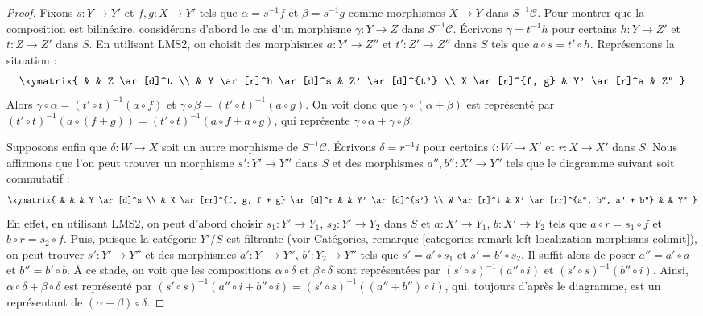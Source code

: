 \begin{proof}
\medskip\noindent
Fixons $s : Y \to Y'$ et $f, g : X \to Y'$ tels que
$\alpha = s^{-1}f$ et $\beta = s^{-1}g$ comme morphismes $X \to Y$
dans $S^{-1}\mathcal{C}$.
Pour montrer que la composition est bilinéaire, considérons d'abord le cas d'un
morphisme $\gamma : Y \to Z$ dans $S^{-1}\mathcal{C}$. Écrivons $\gamma = t^{-1}h$
pour certains $h : Y \to Z'$ et $t : Z \to Z'$ dans $S$. En utilisant LMS2, on
choisit des morphismes $a : Y' \to Z''$ et $t' : Z' \to Z''$ dans $S$ tels
que $a \circ s = t' \circ h$. Représentons la situation :
$$
\xymatrix{
& & Z \ar[d]^t \\
& Y \ar[r]^h \ar[d]^s & Z' \ar[d]^{t'} \\
X \ar[r]^{f, g} & Y' \ar[r]^a & Z''
}
$$
Alors
$\gamma \circ \alpha = (t' \circ t)^{-1}(a \circ f)$ et
$\gamma \circ \beta = (t' \circ t)^{-1}(a \circ g)$.
On voit donc que $\gamma \circ (\alpha + \beta)$ est représenté
par $(t' \circ t)^{-1}(a \circ (f + g)) =
(t' \circ t)^{-1}(a \circ f + a \circ g)$, qui représente
$\gamma \circ \alpha + \gamma \circ \beta$.

\medskip\noindent
Supposons enfin que $\delta : W \to X$ soit un autre morphisme de
$S^{-1}\mathcal{C}$. Écrivons $\delta = r^{-1}i$ pour certains
$i : W \to X'$ et $r : X \to X'$ dans $S$. Nous affirmons que l'on peut trouver
un morphisme $s' : Y' \to Y''$ dans $S$ et des morphismes $a'', b'' : X' \to Y''$
tels que le diagramme suivant soit commutatif :
$$
\xymatrix{
& & & Y \ar[d]^s \\
& X \ar[rr]^{f, g, f + g} \ar[d]^r & & Y' \ar[d]^{s'} \\
W \ar[r]^i & X' \ar[rr]^{a'', b'', a'' + b''} & & Y''
}
$$
En effet, en utilisant LMS2, on peut d'abord choisir
$s_1 : Y' \to Y_1$, $s_2 : Y' \to Y_2$ dans $S$ et
$a : X' \to Y_1$, $b : X' \to Y_2$ tels que
$a \circ r = s_1 \circ f$ et $b \circ r = s_2 \circ f$.
Puis, puisque la catégorie $Y'/S$ est filtrante (voir
Catégories, remarque \ref{categories-remark-left-localization-morphisms-colimit}),
on peut
trouver $s' : Y' \to Y''$ et des morphismes $a' : Y_1 \to Y''$, $b' : Y_2 \to Y''$
tels que $s' = a' \circ s_1$ et $s' = b' \circ s_2$. Il suffit alors de poser
$a'' = a' \circ a$ et $b'' = b' \circ b$.
À ce stade, on voit que les compositions
$\alpha \circ \delta$ et $\beta \circ \delta$ sont représentées par
$(s' \circ s)^{-1}(a'' \circ i)$ et $(s' \circ s)^{-1}(b'' \circ i)$.
Ainsi, $\alpha \circ \delta + \beta \circ \delta$ est représenté
par $(s' \circ s)^{-1}(a'' \circ i + b'' \circ i) =
(s' \circ s)^{-1}((a'' + b'') \circ i)$,
qui, toujours d'après le diagramme, est un représentant
de $(\alpha + \beta) \circ \delta$.
\end{proof}

